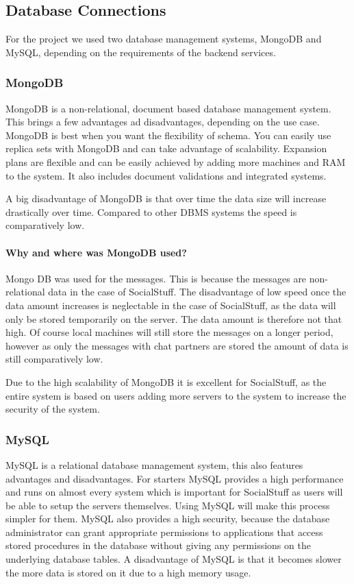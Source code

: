 \subsection{Database Connections}\label{subsec:database-connections}

For the project we used two database management systems, MongoDB and MySQL, depending on the requirements of the backend
services.

\subsubsection{MongoDB}
MongoDB is a non-relational, document based database management system.
This brings a few advantages ad disadvantages, depending on the use case.
MongoDB is best when you want the flexibility of schema.
You can easily use replica sets with MongoDB and can take advantage of scalability.
Expansion plans are flexible and can be easily achieved by adding more machines and RAM to the system.
It also includes document validations and integrated systems.

A big disadvantage of MongoDB is that over time the data size will increase drastically over time.
Compared to other DBMS systems the speed is comparatively low.

\paragraph{Why and where was MongoDB used?}
Mongo DB was used for the messages.
This is because the messages are non-relational data in the case of SocialStuff.
The disadvantage of low speed once the data amount increases is neglectable in the case of SocialStuff, as the data will
only be stored temporarily on the server.
The data amount is therefore not that high.
Of course local machines will still store the messages on a longer period, however as only the messages with chat
partners are stored the amount of data is still comparatively low.

Due to the high scalability of MongoDB it is excellent for SocialStuff, as the entire system is based on users adding
more servers to the system to increase the security of the system.

\subsubsection{MySQL}
MySQL is a relational database management system, this also features advantages and disadvantages.
For starters MySQL provides a high performance and runs on almost every system which is important for SocialStuff as
users will be able to setup the servers themselves.
Using MySQL will make this process simpler for them.
MySQL also provides a high security, because the database administrator can grant appropriate permissions to
applications that access stored procedures in the database without giving any permissions on the underlying database
tables.
A disadvantage of MySQL is that it becomes slower the more data is stored on it due to a high memory usage.


